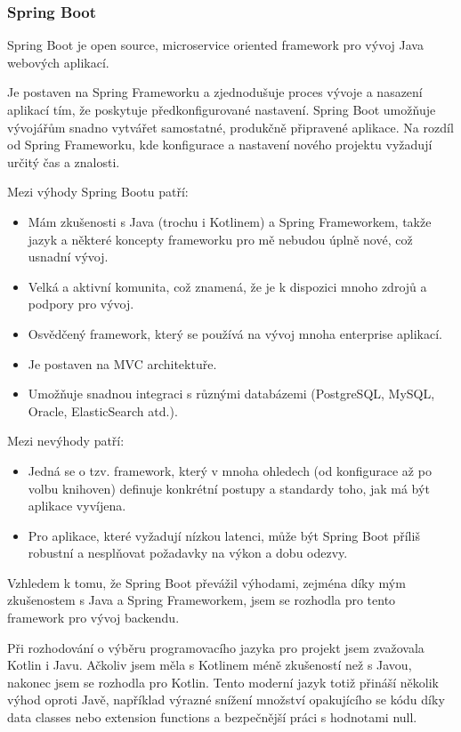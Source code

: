 \subsubsection{Spring Boot}
Spring Boot je open source, microservice oriented framework pro vývoj Java webových aplikací.\cite{what_is_spring_boot}

Je postaven na Spring Frameworku a zjednodušuje proces vývoje a nasazení aplikací tím, že poskytuje předkonfigurované nastavení. Spring Boot umožňuje vývojářům snadno vytvářet samostatné, produkčně připravené aplikace. Na rozdíl od Spring Frameworku, kde konfigurace a nastavení nového projektu vyžadují určitý čas a znalosti. \cite{ibm_what_is_spring_boot}

Mezi výhody Spring Bootu patří:
\begin{itemize}
    \item Mám zkušenosti s Java (trochu i Kotlinem) a Spring Frameworkem, takže jazyk a některé koncepty frameworku pro mě nebudou úplně nové, což usnadní vývoj.
    \item Velká a aktivní komunita, což znamená, že je k dispozici mnoho zdrojů a podpory pro vývoj. \cite{spring_why_spring}
    \item Osvědčený framework, který se používá na vývoj mnoha enterprise aplikací. \cite{spring_why_spring}
    \item Je postaven na MVC architektuře. \cite{mvc_spring_boot}
    \item Umožňuje snadnou integraci s různými databázemi (PostgreSQL, MySQL, Oracle, ElasticSearch atd.). \cite{spring_boot_pros_cons}
\end{itemize}

Mezi nevýhody \cite{spring_boot_pros_cons} patří:
\begin{itemize}
    \item Jedná se o tzv.  framework, který v mnoha ohledech (od konfigurace až po volbu knihoven) definuje konkrétní postupy a standardy toho, jak má být aplikace vyvíjena.
    \item Pro aplikace, které vyžadují nízkou latenci, může být Spring Boot příliš robustní a nesplňovat požadavky na výkon a dobu odezvy.
\end{itemize}

Vzhledem k tomu, že Spring Boot převážil výhodami, zejména díky mým zkušenostem s Java a Spring Frameworkem, jsem se rozhodla pro tento framework pro vývoj backendu.

Při rozhodování o výběru programovacího jazyka pro projekt jsem zvažovala Kotlin i Javu. Ačkoliv jsem měla s Kotlinem méně zkušeností než s Javou, nakonec jsem se rozhodla pro Kotlin. Tento moderní jazyk totiž přináší několik výhod oproti Javě, například výrazné snížení množství opakujícího se kódu díky data classes nebo extension functions a bezpečnější práci s hodnotami null.
\cite{java_vs_kotlin}

